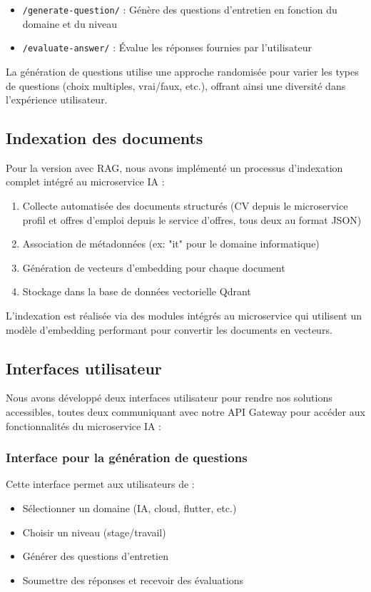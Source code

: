 \begin{itemize}
    \item \texttt{/generate-question/} : Génère des questions d'entretien en fonction du domaine et du niveau
    \item \texttt{/evaluate-answer/} : Évalue les réponses fournies par l'utilisateur
\end{itemize}

La génération de questions utilise une approche randomisée pour varier les types de questions (choix multiples, vrai/faux, etc.), offrant ainsi une diversité dans l'expérience utilisateur.

\subsection{Indexation des documents}
Pour la version avec RAG, nous avons implémenté un processus d'indexation complet intégré au microservice IA :

\begin{enumerate}
    \item Collecte automatisée des documents structurés (CV depuis le microservice profil et offres d'emploi depuis le service d'offres, tous deux au format JSON)
    \item Association de métadonnées (ex: "it" pour le domaine informatique)
    \item Génération de vecteurs d'embedding pour chaque document
    \item Stockage dans la base de données vectorielle Qdrant
\end{enumerate}

L'indexation est réalisée via des modules intégrés au microservice qui utilisent un modèle d'embedding performant pour convertir les documents en vecteurs.

\subsection{Interfaces utilisateur}
Nous avons développé deux interfaces utilisateur pour rendre nos solutions accessibles, toutes deux communiquant avec notre API Gateway pour accéder aux fonctionnalités du microservice IA :

\subsubsection{Interface pour la génération de questions}
Cette interface permet aux utilisateurs de :
\begin{itemize}
    \item Sélectionner un domaine (IA, cloud, flutter, etc.)
    \item Choisir un niveau (stage/travail)
    \item Générer des questions d'entretien
    \item Soumettre des réponses et recevoir des évaluations
\end{itemize}

